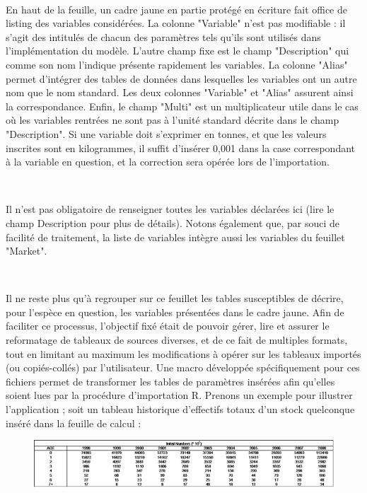 \documentclass[12pt, colorinlistoftodos]{article}
\newenvironment{not used}[1]{%
    \longtable{%
        |>{\centering$\displaystyle}A{#1}{1}<{$}%
        |}\hline\ignorespaces}{%
    \endlongtable\ignorespacesafterend}
\newcommand\Warning{%
 \makebox[1.4em][c]{%
 \makebox[0pt][c]{\raisebox{.1em}{\small!}}%
 \makebox[0pt][c]{\color{red}\Large$\bigtriangleup$}}}%
\begin{document}
\par~\par

En haut de la feuille, un cadre jaune en partie protégé en écriture fait office de listing des variables considérées. La colonne "Variable" n'est pas modifiable : il s'agit des intitulés de chacun des paramètres tels qu'ils sont utilisés dans l'implémentation du modèle. L'autre champ fixe est le champ "Description" qui comme son nom l'indique présente rapidement les variables. La colonne "Alias" permet d'intégrer des tables de données dans lesquelles les variables ont un autre nom que le nom standard. Les deux colonnes "Variable" et "Alias" assurent ainsi la correspondance.  Enfin, le champ "Multi" est un multiplicateur utile dans le cas où les variables rentrées ne sont pas à l'unité standard décrite dans le champ "Description". Si une variable doit s'exprimer en tonnes, et que les valeurs inscrites sont en kilogrammes, il suffit d'insérer 0,001 dans la case correspondant à la variable en question, et la correction sera opérée lors de l'importation.

\par~\par

\Warning Il n'est pas obligatoire de renseigner toutes les variables déclarées ici (lire le champ Description pour plus de détails). Notons également que, par souci de facilité de traitement, la liste de variables intègre aussi les variables du feuillet "Market".

\par~\par

Il ne reste plus qu'à regrouper sur ce feuillet les tables susceptibles de décrire, pour l'espèce en question, les variables présentées dans le cadre jaune. Afin de faciliter ce processus, l'objectif fixé était de pouvoir gérer, lire et assurer le reformatage de tableaux de sources diverses, et de ce fait de multiples formats, tout en limitant au maximum les modifications à opérer sur les tableaux importés (ou copiés-collés) par l'utilisateur. Une macro développée spécifiquement pour ces fichiers permet de transformer les tables de paramètres insérées afin qu'elles soient lues par la procédure d'importation R. Prenons un exemple pour illustrer l'application ; soit un tableau historique d'effectifs totaux d'un stock quelconque inséré dans la feuille de calcul :

\begin{figure}[h!]
\begin{center}
\includegraphics[width = \textwidth]{figures/param/stock1.png}
\end{center}
\label{fig:ex}
\end{figure}
\end{document}
